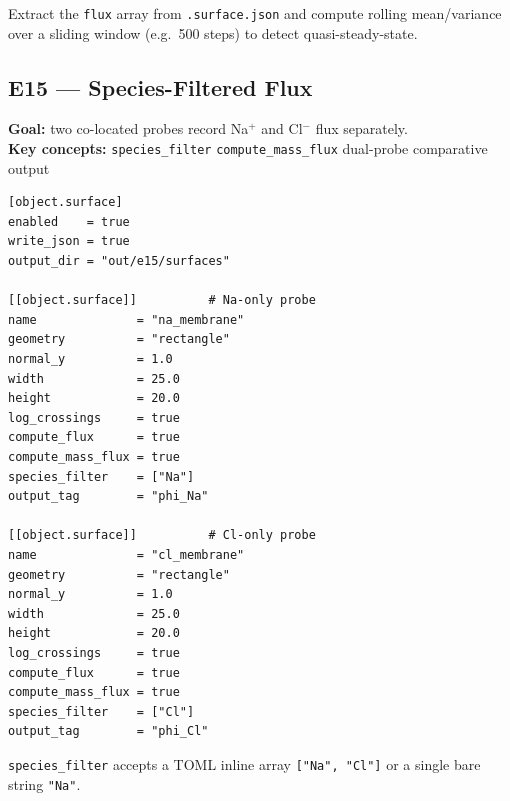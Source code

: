 \documentclass[11pt,a4paper]{article}
\begin{document}
\begin{tcolorbox}[enhanced, colback=vsimcodebg, colframe=vsimrule,
  arc=3pt, boxrule=0.6pt, fonttitle=\sffamily\small\bfseries\color{vsimkw},
  title={Tip}]
\footnotesize
Extract the \texttt{flux} array from \texttt{.surface.json} and compute
rolling mean/variance over a sliding window (e.g.\ 500 steps) to detect
quasi-steady-state.
\end{tcolorbox}

\subsection*{E15 --- Species-Filtered Flux}

\textbf{Goal:} two co-located probes record Na$^+$ and Cl$^-$ flux separately.\\
\textbf{Key concepts:} \texttt{species\_filter} \textbullet{}
\texttt{compute\_mass\_flux} \textbullet{} dual-probe comparative output

\begin{tcolorbox}[scriptbox, scriptheader,
  title={scripts/e15\_surface\_species\_filtered\_flux.vsim}]
\begin{lstlisting}[style=vsimlst]
[object.surface]
enabled    = true
write_json = true
output_dir = "out/e15/surfaces"

[[object.surface]]          # Na-only probe
name              = "na_membrane"
geometry          = "rectangle"
normal_y          = 1.0
width             = 25.0
height            = 20.0
log_crossings     = true
compute_flux      = true
compute_mass_flux = true
species_filter    = ["Na"]
output_tag        = "phi_Na"

[[object.surface]]          # Cl-only probe
name              = "cl_membrane"
geometry          = "rectangle"
normal_y          = 1.0
width             = 25.0
height            = 20.0
log_crossings     = true
compute_flux      = true
compute_mass_flux = true
species_filter    = ["Cl"]
output_tag        = "phi_Cl"
\end{lstlisting}
\end{tcolorbox}

\begin{tcolorbox}[enhanced, colback=vsimcodebg, colframe=vsimrule,
  arc=3pt, boxrule=0.6pt, fonttitle=\sffamily\small\bfseries\color{vsimkw},
  title={Tip}]
\footnotesize
\texttt{species\_filter} accepts a TOML inline array
\texttt{["Na",\,"Cl"]} or a single bare string \texttt{"Na"}.
\end{tcolorbox}
\end{document}
